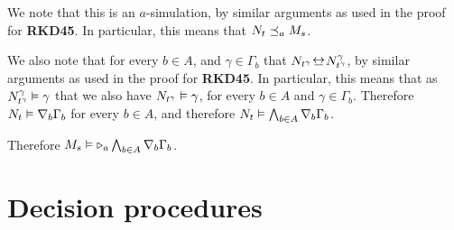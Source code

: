 We note that this is an $a$-simulation, by similar arguments as used in the
proof for {\bf RKD45}. In particular, this means that $N_t \preceq_a M_s$.

We also note that for every $b \in A$, and $\gamma \in \Gamma_b$ that
$N_{t^\gamma} \bisim N^\gamma_{t^\gamma}$, by similar arguments as used in the
proof for {\bf RKD45}. In particular, this means that as $N^\gamma_{t^\gamma}
\vDash \gamma$ that we also have $N_{t^\gamma} \vDash \gamma$, for every $b
\in A$ and $\gamma \in \Gamma_b$. Therefore $N_t \vDash \nabla_b \Gamma_b$
for every $b \in A$, and therefore $N_t \vDash \bigwedge_{b \in A} \nabla_b
\Gamma_b$.

Therefore $M_s \vDash {\ensuremath{\mathopen{\triangleright}}}_a \bigwedge_{b \in A} \nabla_b \Gamma_b$.

\section{Decision procedures}
